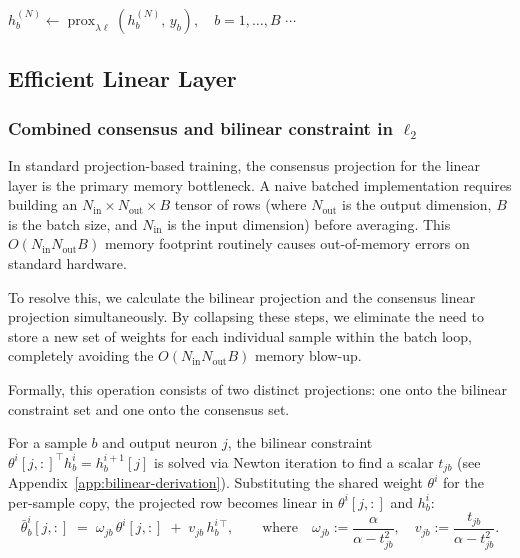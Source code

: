 \documentclass{article}
\theoremstyle{plain}
\theoremstyle{definition}
\theoremstyle{remark}
\begin{document}
\begin{algorithm}
\begin{algorithmic}[1]
\State $h^{(N)}_b \gets \operatorname{prox}_{\lambda \ell}\!\left(h^{(N)}_b,\, y_b\right), \quad b=1,\ldots,B$
    \State $\cdots$
\EndFor
\end{algorithmic}
\end{algorithm}
\newpage

\subsection{Efficient Linear Layer}
\subsubsection{Combined consensus and bilinear constraint in  $\ell_2$}

In standard projection-based training, the consensus projection for the linear layer is the primary memory bottleneck. A naive batched implementation requires building an $N_{\mathrm{in}} \times N_{\mathrm{out}} \times B $ tensor of rows (where $N_{\mathrm{out}}$ is the output dimension, $B$ is the batch size, and $N_{\mathrm{in}}$ is the input dimension) before averaging. This $O(N_{\mathrm{in}}N_{\mathrm{out}}B)$  memory footprint routinely causes out-of-memory errors on standard hardware.

To resolve this, we calculate the bilinear projection and the consensus linear projection simultaneously. By collapsing these steps, we eliminate the need to store a new set of weights for each individual sample within the batch loop, completely avoiding the  $O(N_{\mathrm{in}}N_{\mathrm{out}}B)$ memory blow-up.

Formally, this operation consists of two distinct projections: one onto the bilinear constraint set and one onto the consensus set. 

For a sample $b$ and output neuron $j$, the bilinear constraint $\theta^{i}[j,:]^{\top} h^{i}_{b} = h^{i+1}_{b}[j]$ is solved via Newton iteration to find a scalar $t_{jb}$ (see Appendix~\ref{app:bilinear-derivation}). Substituting the shared weight $\theta^{i}$ for the per-sample copy, the projected row becomes linear in $\theta^{i}[j,:]$ and $h^{i}_{b}$:
\begin{equation}
    \bar\theta^{i}_{b}[j,:] \;=\; \omega_{jb}\,\theta^{i}[j,:] \;+\; v_{jb}\, h^{i}_{b}{}^{\top}, \qquad \text{where} \quad \omega_{jb} := \frac{\alpha}{\alpha - t_{jb}^{2}}, \quad v_{jb} := \frac{t_{jb}}{\alpha - t_{jb}^{2}}.
\end{equation}
\end{document}
